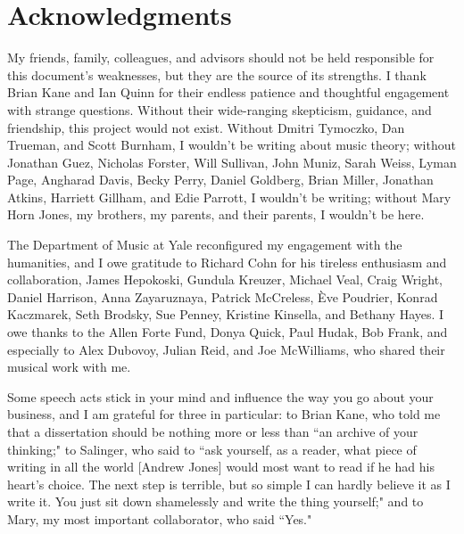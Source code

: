 \section*{Acknowledgments}

My friends, family, colleagues, and advisors should not be held responsible for this document's weaknesses, but they are the source of its strengths.  I thank Brian Kane and Ian Quinn for their endless patience and thoughtful engagement with strange questions.  Without their wide-ranging skepticism, guidance, and friendship, this project would not exist.  Without Dmitri Tymoczko, Dan Trueman, and Scott Burnham, I wouldn't be writing about music theory; without Jonathan Guez, Nicholas Forster, Will Sullivan, John Muniz, Sarah Weiss, Lyman Page, Angharad Davis, Becky Perry, Daniel Goldberg, Brian Miller, Jonathan Atkins, Harriett Gillham, and Edie Parrott, I wouldn't be writing; without Mary Horn Jones, my brothers, my parents, and their parents, I wouldn't be here.

The Department of Music at Yale reconfigured my engagement with the humanities, and I owe gratitude to Richard Cohn for his tireless enthusiasm and collaboration, James Hepokoski, Gundula Kreuzer, Michael Veal, Craig Wright, Daniel Harrison, Anna Zayaruznaya, Patrick McCreless, \`{E}ve Poudrier, Konrad Kaczmarek, Seth Brodsky, Sue Penney, Kristine Kinsella, and Bethany Hayes.  I owe thanks to the Allen Forte Fund, Donya Quick, Paul Hudak, Bob Frank, and especially to Alex Dubovoy, Julian Reid, and Joe McWilliams, who shared their musical work with me.

Some speech acts stick in your mind and influence the way you go about your business, and I am grateful for three in particular: to Brian Kane, who told me that a dissertation should be nothing more or less than ``an archive of your thinking;" to Salinger, who said to ``ask yourself, as a reader, what piece of writing in all the world [Andrew Jones] would most want to read if he had his heart's choice. The next step is terrible, but so simple I can hardly believe it as I write it. You just sit down shamelessly and write the thing yourself;" and to Mary, my most important collaborator, who said ``Yes."